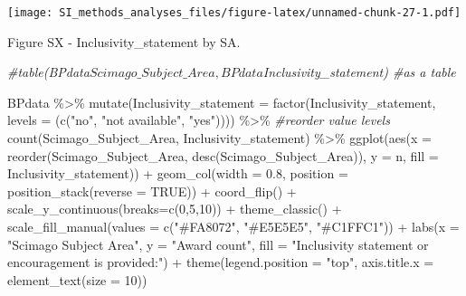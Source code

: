 \documentclass[
]{article}
\newenvironment{Shaded}{\begin{snugshade}}{\end{snugshade}}
\newcommand{\AttributeTok}[1]{\textcolor[rgb]{0.77,0.63,0.00}{#1}}
\newcommand{\CommentTok}[1]{\textcolor[rgb]{0.56,0.35,0.01}{\textit{#1}}}
\newcommand{\ConstantTok}[1]{\textcolor[rgb]{0.00,0.00,0.00}{#1}}
\newcommand{\DecValTok}[1]{\textcolor[rgb]{0.00,0.00,0.81}{#1}}
\newcommand{\FloatTok}[1]{\textcolor[rgb]{0.00,0.00,0.81}{#1}}
\newcommand{\FunctionTok}[1]{\textcolor[rgb]{0.00,0.00,0.00}{#1}}
\newcommand{\NormalTok}[1]{#1}
\newcommand{\SpecialCharTok}[1]{\textcolor[rgb]{0.00,0.00,0.00}{#1}}
\newcommand{\StringTok}[1]{\textcolor[rgb]{0.31,0.60,0.02}{#1}}
\begin{document}
\texttt{[image: SI\_methods\_analyses\_files/figure-latex/unnamed-chunk-27-1.pdf]}

Figure SX - Inclusivity\_statement by SA.

\begin{Shaded}
\begin{Highlighting}[]
\CommentTok{\#table(BPdata$Scimago\_Subject\_Area, BPdata$Inclusivity\_statement) \#as a table}

\NormalTok{BPdata }\SpecialCharTok{\%\textgreater{}\%} 
    \FunctionTok{mutate}\NormalTok{(}\AttributeTok{Inclusivity\_statement =} \FunctionTok{factor}\NormalTok{(Inclusivity\_statement, }\AttributeTok{levels =}\NormalTok{ (}\FunctionTok{c}\NormalTok{(}\StringTok{"no"}\NormalTok{, }\StringTok{"not available"}\NormalTok{, }\StringTok{"yes"}\NormalTok{)))) }\SpecialCharTok{\%\textgreater{}\%} \CommentTok{\#reorder value levels}
    \FunctionTok{count}\NormalTok{(Scimago\_Subject\_Area, Inclusivity\_statement) }\SpecialCharTok{\%\textgreater{}\%}
    \FunctionTok{ggplot}\NormalTok{(}\FunctionTok{aes}\NormalTok{(}\AttributeTok{x =} \FunctionTok{reorder}\NormalTok{(Scimago\_Subject\_Area, }\FunctionTok{desc}\NormalTok{(Scimago\_Subject\_Area)), }\AttributeTok{y =}\NormalTok{ n, }\AttributeTok{fill =}\NormalTok{ Inclusivity\_statement)) }\SpecialCharTok{+} 
    \FunctionTok{geom\_col}\NormalTok{(}\AttributeTok{width =} \FloatTok{0.8}\NormalTok{, }\AttributeTok{position =} \FunctionTok{position\_stack}\NormalTok{(}\AttributeTok{reverse =} \ConstantTok{TRUE}\NormalTok{)) }\SpecialCharTok{+}
    \FunctionTok{coord\_flip}\NormalTok{() }\SpecialCharTok{+}
    \FunctionTok{scale\_y\_continuous}\NormalTok{(}\AttributeTok{breaks=}\FunctionTok{c}\NormalTok{(}\DecValTok{0}\NormalTok{,}\DecValTok{5}\NormalTok{,}\DecValTok{10}\NormalTok{)) }\SpecialCharTok{+}
    \FunctionTok{theme\_classic}\NormalTok{() }\SpecialCharTok{+} 
    \FunctionTok{scale\_fill\_manual}\NormalTok{(}\AttributeTok{values =} \FunctionTok{c}\NormalTok{(}\StringTok{"\#FA8072"}\NormalTok{, }\StringTok{"\#E5E5E5"}\NormalTok{, }\StringTok{"\#C1FFC1"}\NormalTok{)) }\SpecialCharTok{+}
    \FunctionTok{labs}\NormalTok{(}\AttributeTok{x =} \StringTok{"Scimago Subject Area"}\NormalTok{, }\AttributeTok{y =} \StringTok{"Award count"}\NormalTok{, }\AttributeTok{fill =} \StringTok{"Inclusivity statement or encouragement is provided:"}\NormalTok{) }\SpecialCharTok{+} 
    \FunctionTok{theme}\NormalTok{(}\AttributeTok{legend.position =} \StringTok{"top"}\NormalTok{, }\AttributeTok{axis.title.x =} \FunctionTok{element\_text}\NormalTok{(}\AttributeTok{size =} \DecValTok{10}\NormalTok{))}
\end{Highlighting}
\end{Shaded}
\end{document}
